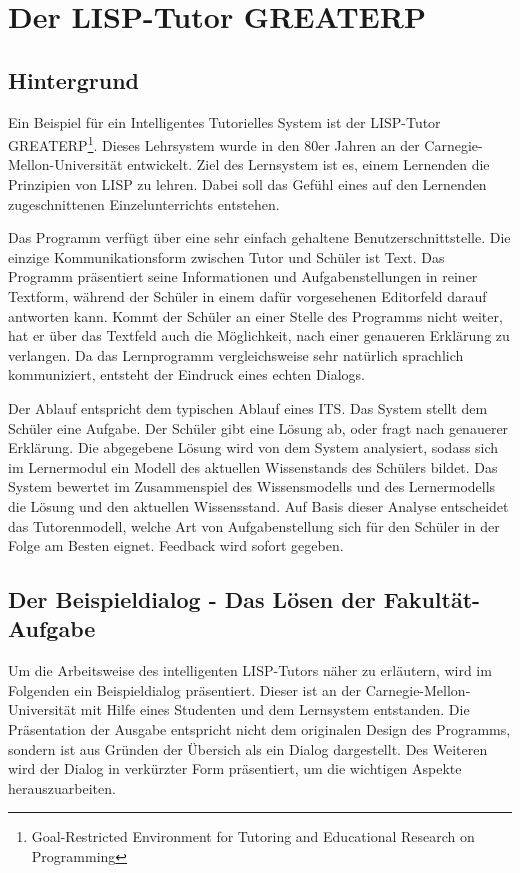 \chapter{Der LISP-Tutor GREATERP}

\section{Hintergrund}
Ein Beispiel für ein Intelligentes Tutorielles System ist der LISP-Tutor GREATERP\footnote{Goal-Restricted Environment for Tutoring and Educational Research on Programming}.
Dieses Lehrsystem wurde in den 80er Jahren an der Carnegie-Mellon-Universität entwickelt.
Ziel des Lernsystem ist es, einem Lernenden die Prinzipien von LISP zu lehren. Dabei soll das
Gefühl eines auf den Lernenden zugeschnittenen Einzelunterrichts entstehen.\cite[S. 159]{anderson1985}

Das Programm verfügt über eine sehr einfach gehaltene Benutzerschnittstelle.
Die einzige Kommunikationsform zwischen Tutor und Schüler ist Text.
Das Programm präsentiert seine Informationen und Aufgabenstellungen in reiner Textform,
während der Schüler in einem dafür vorgesehenen Editorfeld darauf antworten kann.
Kommt der Schüler an einer Stelle des Programms nicht weiter, hat er über das Textfeld auch die Möglichkeit,
nach einer genaueren Erklärung zu verlangen.
Da das Lernprogramm vergleichsweise sehr natürlich sprachlich kommuniziert, entsteht der
Eindruck eines echten Dialogs.

Der Ablauf entspricht dem typischen Ablauf eines ITS.
Das System stellt dem Schüler eine Aufgabe. Der Schüler gibt eine Lösung ab, oder fragt nach genauerer Erklärung.
Die abgegebene Lösung wird von dem System analysiert, sodass sich im Lernermodul ein Modell des aktuellen Wissenstands des Schülers bildet.
Das System bewertet im Zusammenspiel des Wissensmodells und des Lernermodells die Lösung und den aktuellen Wissensstand.
Auf Basis dieser Analyse entscheidet das Tutorenmodell, welche Art von Aufgabenstellung sich für den Schüler in der Folge am Besten eignet.
Feedback wird sofort gegeben.\cite[S. 160f]{anderson1985}

\section{Der Beispieldialog - Das Lösen der Fakultät-Aufgabe}
Um die Arbeitsweise des intelligenten LISP-Tutors näher zu erläutern,
wird im Folgenden ein Beispieldialog präsentiert. Dieser ist an der
Carnegie-Mellon-Universität mit Hilfe eines Studenten und dem Lernsystem entstanden.
Die Präsentation der Ausgabe entspricht nicht dem originalen Design des Programms,
sondern ist aus Gründen der Übersich als ein Dialog dargestellt.
Des Weiteren wird der Dialog in verkürzter Form präsentiert, um die wichtigen Aspekte
herauszuarbeiten.
\newpage

